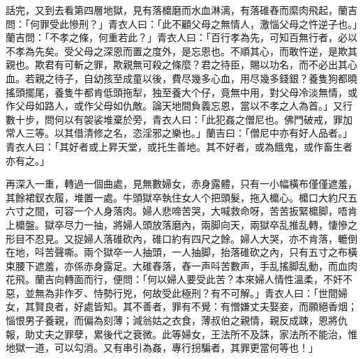 \documentclass[a5paper, 12pt, openany]{book} %
\begin{document}
	話完，又到去看第四層地獄，見有落𣟖磨而水血淋漓，有落碓舂而縻肉飛起，蘭吉問：「何罪受此慘刑？」青衣人曰：「此不顧父母之無情人，激惱父母之忤逆子也。」蘭吉問：「不孝之條，何重若此？」青衣人曰：「百行孝為先，可知百無行者，必以不孝為先矣。受父母之深恩而置之度外，是忘恩也。不順其心，而敢忤逆，是欺其親也。欺君有可斬之罪，欺親無可殺之條麼？君之待臣，賜以功名，而不必出其心血。若親之待子，自幼孩至成童以後，費尽幾多心血，用尽幾多錢銀？養隻狗都曉搖頭擺尾，養隻牛都肯低頭拖犁，独至養大个仔，竟無中用，對父母冷淡無情，或作父母如路人，或作父母如仇敵。論天地間負義忘恩，當以不孝之人為首。」又行數十步，問何以有袈裟堆棄於旁，青衣人曰：「此犯姦之僧尼也。佛門破戒，罪加常人三等。以其借清修之名，恣淫邪之樂也。」蘭吉曰：「僧尼中亦有好人品者。」青衣人曰：「其好者或上昇天堂，或托生善地。其不好者，或為餓鬼，或作畜生者亦有之。」

	再深入一重，轉過一個曲處，見無數婦女，赤身露體，只有一小幅橫布僅僅遮羞，其餘裙釵衣履，堆置一處。牛頭獄卒執住女人个把頭髮，拖入𣟖心。𣟖口大約尺五六寸之間，可容一个人身落肉。婦人悲啼苦哭，大喊救命呀，苦苦扳緊𣟖脚，唔肯上𣟖盤。獄卒尽力一抽，將婦人頭放落磨內，兩脚向天，兩獄卒乱推乱轉，悽慘之形目不忍見。又捉婦人落碓砍內，碓口約有四尺之餘。婦人大哭，亦不肯落，轆倒在地，呌苦聲嘶。兩个獄卒一人抽頭，一人抽脚，抬落碓砍之內，只有五寸之布橫束腰下遮羞，亦係赤身露足。大碓舂落，舂一声呌苦數声，手乱搖脚乱動，而血肉花飛。蘭吉向轉面而行，便問：「何以婦人要受此苦？本來婦人情性溫柔，不奸不惡，並無為非作歹、恃勢行兇，何故受此極刑？有不可解。」青衣人曰：「世間婦女，其賢良者，好處皆知。其不善者，罪有不覺：有憎嫌丈夫娶妾，而願絕香烟；惱恨男子養親，而偏為刻薄；減翁姑之衣食，薄叔伯之親情，親反成踈，恩將仇報，助丈夫之罪孽，累後代之衰微。此等婦女，王法所不及誅，家法所不能治，惟地獄一道，可以勾消。又有串引為姦，專行拐騙者，其罪更當何等也！」
\end{document}
